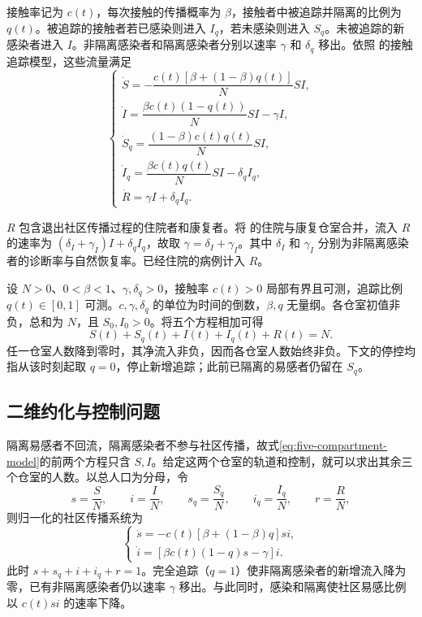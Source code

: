 \documentclass[lang=cn,a4paper,newtx]{elegantpaper}
\theoremstyle{plain}
\theoremstyle{definition}
\begin{document}
接触率记为 $c(t)$，每次接触的传播概率为 $\beta$，接触者中被追踪并隔离的比例为 $q(t)$。被追踪的接触者若已感染则进入 $I_q$，若未感染则进入 $S_q$。未被追踪的新感染者进入 $I$。非隔离感染者和隔离感染者分别以速率 $\gamma$ 和 $\delta_q$ 移出。依照 \textcite{Zhou2024SPCI} 的接触追踪模型，这些流量满足
\begin{equation}
\begin{cases}
\dot S=-\dfrac{c(t)[\beta+(1-\beta)q(t)]}{N}SI,\\[.4em]
\dot I=\dfrac{\beta c(t)(1-q(t))}{N}SI-\gamma I,\\[.4em]
\dot S_q=\dfrac{(1-\beta)c(t)q(t)}{N}SI,\\[.4em]
\dot I_q=\dfrac{\beta c(t)q(t)}{N}SI-\delta_q I_q,\\[.4em]
\dot R=\gamma I+\delta_q I_q.
\end{cases}
\label{eq:five-compartment-model}
\end{equation}

$R$ 包含退出社区传播过程的住院者和康复者。将 \textcite[式(2.1)]{Zhou2024SPCI} 的住院与康复仓室合并，流入 $R$ 的速率为 $(\delta_I+\gamma_I)I+\delta_q I_q$，故取 $\gamma=\delta_I+\gamma_I$。其中 $\delta_I$ 和 $\gamma_I$ 分别为非隔离感染者的诊断率与自然恢复率。已经住院的病例计入 $R$。

设 $N>0$、$0<\beta<1$、$\gamma,\delta_q>0$，接触率 $c(t)>0$ 局部有界且可测，追踪比例 $q(t)\in[0,1]$ 可测。$c,\gamma,\delta_q$ 的单位为时间的倒数，$\beta,q$ 无量纲。各仓室初值非负，总和为 $N$，且 $S_0,I_0>0$。将五个方程相加可得
\begin{equation}
 S(t)+S_q(t)+I(t)+I_q(t)+R(t)=N.
 \label{eq:five-compartment-conservation}
\end{equation}
任一仓室人数降到零时，其净流入非负，因而各仓室人数始终非负。下文的停控均指从该时刻起取 $q=0$，停止新增追踪；此前已隔离的易感者仍留在 $S_q$。

\subsection{二维约化与控制问题}

隔离易感者不回流，隔离感染者不参与社区传播，故式\eqref{eq:five-compartment-model}的前两个方程只含 $S,I$。给定这两个仓室的轨道和控制，就可以求出其余三个仓室的人数。以总人口为分母，令
\[
 s=\frac SN,\qquad i=\frac IN,\qquad
 s_q=\frac{S_q}{N},\qquad i_q=\frac{I_q}{N},\qquad r=\frac RN,
\]
则归一化的社区传播系统为
\begin{equation}
\begin{cases}
\dot s=-c(t)[\beta+(1-\beta)q]si,\\
\dot i=[\beta c(t)(1-q)s-\gamma]i.
\end{cases}
\label{eq:normalized-model}
\end{equation}
此时 $s+s_q+i+i_q+r=1$。完全追踪（$q=1$）使非隔离感染者的新增流入降为零，已有非隔离感染者仍以速率 $\gamma$ 移出。与此同时，感染和隔离使社区易感比例以 $c(t)si$ 的速率下降。
\end{document}
